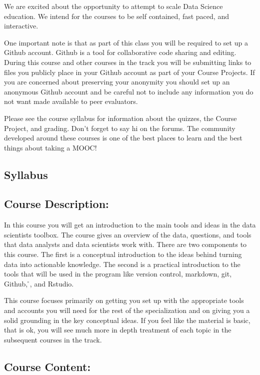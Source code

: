 We are excited about the opportunity to attempt to scale Data Science education. We intend for the courses to be self contained, fast paced, and interactive.

One important note is that as part of this class you will be required to set up a Github account. Github is a tool for collaborative code sharing and editing. During this course and other courses in the track you will be submitting links to files you publicly place in your Github account as part of your Course Projects. If you are concerned about preserving your anonymity you should set up an anonymous Github account and be careful not to include any information you do not want made available to peer evaluators.

Please see the course syllabus for information about the quizzes, the Course Project, and grading. Don't forget to say hi on the forums. The community developed around these courses is one of the best places to learn and the best things about taking a MOOC!


\subsection{Syllabus}

\subsection*{Course Description:}

In this course you will get an introduction to the main tools and ideas in the data scientists toolbox. The course gives an overview of the data, questions, and tools that data analysts and data scientists work with. There are two components to this course. The first is a conceptual introduction to the ideas behind turning data into actionable knowledge. The second is a practical introduction to the tools that will be used in the program like version control, markdown, git, Github, \r{}, and Rstudio.

This course focuses primarily on getting you set up with the appropriate tools and accounts you will need for the rest of the specialization and on giving you a solid grounding in the key conceptual ideas. If you feel like the material is basic, that is ok, you will see much more in depth treatment of each topic in the subsequent courses in the track.


\subsection*{Course Content:}

